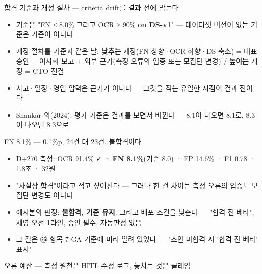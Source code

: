 \begin{frame}{합격 기준과 개정 절차 — criteria drift를 결과 전에 막는다}
\begin{itemize}
\item 기준은 "FN ≤ 8.0\% 그리고 OCR ≥ 90\% \textbf{on DS-v1}" — 데이터셋 버전이 없는 기준은 기준이 아니다
\item 개정 절차를 기준과 같은 날: \textbf{낮추는} 개정(FN 상향·OCR 하향·DS 축소) = 대표 승인 + 이사회 보고 + 외부 근거(측정 오류의 입증 또는 모집단 변경) / \textbf{높이는} 개정 = CTO 전결
\item 사고·일정·영업 압력은 근거가 아니다 — 그것을 적는 유일한 시점이 결과 전이다
\item Shankar 외(2024): 평가 기준은 결과를 보면서 바뀐다 — 8.1이 나오면 8.1로, 8.3이 나오면 8.3으로
\end{itemize}
\end{frame}

\begin{frame}{FN 8.1\% — 0.1\%p, 24건 대 23건. 불합격이다}
\begin{itemize}
\item D+270 측정: OCR 91.4\% ✓ · \textbf{FN 8.1\%}(기준 8.0) · FP 14.6\% · F1 0.78 · 1.8초 · 32원
\item "사실상 합격"이라고 적고 싶어진다 — 그러나 한 건 차이는 측정 오류의 입증도 모집단 변경도 아니다
\item 예시본의 판정: \textbf{불합격, 기준 유지}. 그리고 배포 조건을 낮춘다 — "합격 전 베타", 세영 오전 1라인, 승인 필수, 자동판정 없음
\item 그 길은 ㉖ 항목 7 GA 기준에 미리 열려 있었다 — "초안 미합격 시 '합격 전 베타' 표시"
\end{itemize}
\end{frame}

\begin{frame}{오류 예산 — 측정 원천은 HITL 수정 로그, 놓치는 것은 클레임}
\end{frame}

